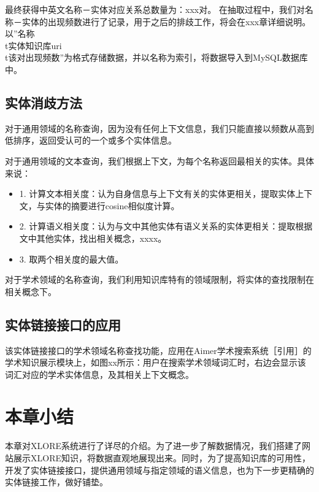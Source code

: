 最终获得中英文名称－实体对应关系总数量为：xxx对。
在抽取过程中，我们对名称－实体的出现频数进行了记录，用于之后的排歧工作，将会在xxx章详细说明。以”名称\\t实体知识库uri\\t该对出现频数”为格式存储数据，并以名称为索引，将数据导入到MySQL数据库中。

\subsection{实体消歧方法}
对于通用领域的名称查询，因为没有任何上下文信息，我们只能直接以频数从高到低排序，返回受认可的一个或多个实体信息。

对于通用领域的文本查询，我们根据上下文，为每个名称返回最相关的实体。具体来说：
\begin{itemize}
\item 1.  计算文本相关度：认为自身信息与上下文有关的实体更相关，提取实体上下文，与实体的摘要进行cosine相似度计算。
\item 2.  计算语义相关度：认为与文中其他实体有语义关系的实体更相关：提取根据文中其他实体，找出相关概念，xxxx。
\item 3.  取两个相关度的最大值。
\end{itemize}

对于学术领域的名称查询，我们利用知识库特有的领域限制，将实体的查找限制在相关概念下。

\subsection{实体链接接口的应用}
该实体链接接口的学术领域名称查找功能，应用在Aimer学术搜索系统［引用］的学术知识展示模块上，如图xx所示：用户在搜索学术领域词汇时，右边会显示该词汇对应的学术实体信息，及其相关上下文概念。

\section{本章小结}
本章对XLORE系统进行了详尽的介绍。为了进一步了解数据情况，我们搭建了网站展示XLORE知识，将数据直观地展现出来。同时，为了提高知识库的可用性，开发了实体链接接口，提供通用领域与指定领域的语义信息，也为下一步更精确的实体链接工作，做好铺垫。







